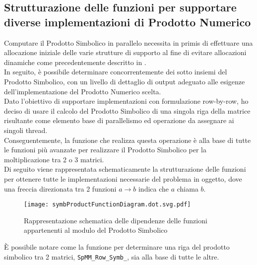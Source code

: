 \subsection[Strutturazione delle funzioni a supporto\\delle implementazioni del Prodotto Numerico]
{Strutturazione delle funzioni per supportare diverse implementazioni di Prodotto Numerico}
Computare il Prodotto Simbolico in parallelo necessita in primis di effettuare una 
allocazione iniziale delle varie strutture di supporto al fine di evitare allocazioni dinamiche
come precedentemente descritto in .\\
In seguito, è possibile determinare concorrentemente dei sotto insiemi del Prodotto Simbolico, con un
livello di dettaglio di output adeguato alle esigenze dell'implementazione del Prodotto Numerico scelta.\\
\voidLine
Dato l'obiettivo di supportare implementazioni con formulazione row-by-row, ho deciso di usare 
il calcolo del Prodotto Simbolico di una singola riga della matrice risultante 
come elemento base di parallelismo ed operazione da assegnare ai singoli thread.\\
\label{chSpMMSymb:accurateBaseBlock}%
Conseguentemente, la funzione che realizza questa operazione è alla base di tutte le funzioni
più avanzate per realizzare il Prodotto Simbolico per la moltiplicazione tra 2 o 3 matrici.\\
Di seguito viene rappresentata schematicamente la strutturazione delle funzioni per ottenere tutte le implementazioni
necessarie del problema in oggetto,
dove una freccia direzionata tra 2 funzioni $a \rightarrow b$ indica che $a$ chiama $b$.\\
\begin{figure}[H]
  \caption[combo funzioni per il Prodotto Simbolico accurato]
  {Rappresentazione schematica delle dipendenze delle funzioni appartenenti al modulo del Prodotto Simbolico}
  \centering \texttt{[image: symbProductFunctionDiagram.dot.svg.pdf]} \decoRule
  \label{fig:symbProductFunctionDiagram}
\end{figure}
\label{SpMM_Row_Symb_}
È possibile notare come la funzione per determinare una riga del prodotto simbolico tra 2 matrici,
\verb|SpMM_Row_Symb_|, sia alla base di tutte le altre.\\ %

